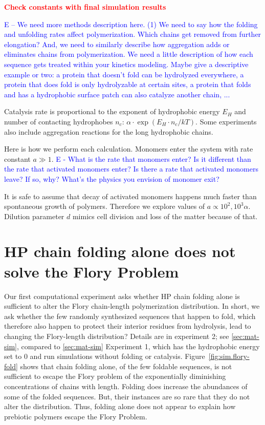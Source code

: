 \documentclass[journal=jacsat,manuscript=article,layout=twocolumn]{achemso}
\newcommand*{\ga}{\alpha}
\newcommand*{\red}[1]{\textcolor{red}{#1}}
\newcommand*{\blue}[1]{\textcolor{blue}{#1}}
\begin{document}
\red{\textbf{Check constants with final simulation results}}

\blue{E -- We need more methods description here.  (1) We need to say how the folding and 
unfolding rates affect polymerization.  Which chains get removed from further elongation?  And, we 
need to similarly describe how aggregation adds or eliminates chains from polymerization.  We need a 
little description of how each sequence gets treated within your kinetics modeling.  Maybe give a 
descriptive example or two: a protein that doesn't fold can be hydrolyzed everywhere, a protein that 
does fold is only hydrolyzable at certain sites, a protein that folds and has a hydrophobic surface 
patch can also catalyze another chain, ...}

Catalysis rate is proportional to the exponent of hydrophobic energy $E_H$ and number of 
contacting hydrophobes $n_c$: $\ga\cdot\exp(E_{H}\cdot n_{c}/kT)$. Some experiments also include 
aggregation reactions for the long hydrophobic chains.

Here is how we perform each calculation.  Monomers enter the system with rate constant $a\gg1$.  
\blue{E - What is the rate that monomers enter?  Is it different than the rate that activated 
monomers enter?  Is there a rate that activated monomers leave?  If so, why?  What's the physics you 
envision of monomer exit?}  

It is safe to assume that decay of activated monomers happens much faster than spontaneous 
growth of polymers. Therefore we explore values of $a\propto 10^2,10^3\ga$. Dilution parameter $d$ 
mimics cell division and loss of the matter because of 
that.


\section{HP chain folding alone does not solve the Flory Problem}
Our first computational experiment asks whether HP chain folding alone is sufficient to 
alter the Flory chain-length polymerization distribution.  In short, we ask whether the few randomly 
synthesized sequences that happen to fold, which therefore also happen to protect their interior 
residues from hydrolysis, lead to changing the Flory-length distribution?  Details are in experiment 
2; see \ref{sec:mat-sim}, compared to \ref{sec:mat-sim}  Experiment 1, which has the hydrophobic 
energy set to 0 and run simulations without folding or catalysis.  Figure~\ref{fig:sim.flory-fold} 
shows that chain folding alone, of the few foldable sequences, is not sufficient to escape the Flory 
problem of the exponentially diminishing concentrations of chains with length.  Folding does 
increase the abundances of some of the folded sequences.  But, their instances are so rare that they 
do not alter the distribution.  Thus, folding alone does not appear to explain how prebiotic 
polymers escape the Flory Problem.
\end{document}
